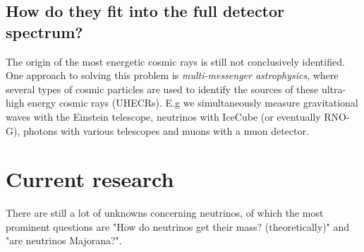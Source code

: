 \documentclass[11pt,a4paper,faculty=we,language=en,doctype=report]{cls/ugent-doc}
\begin{document}
\subsection{How do they fit into the full detector spectrum?}
The origin of the most energetic cosmic rays is still not conclusively
identified. One approach to solving this problem is \textit{multi-messenger
astrophysics}, where several types of cosmic particles are used to identify the
sources of these ultra-high energy cosmic rays (UHECRs). E.g we simultaneously
measure gravitational waves with the Einstein telescope,
neutrinos with IceCube (or eventually RNO-G), photons with various telescopes
and muons with a muon detector.

\section{Current research}
There are still a lot of unknowns concerning neutrinos, of which the most prominent questions
are "How do neutrinos get their mass? (theoretically)" and "are neutrinos Majorana?".
\end{document}

